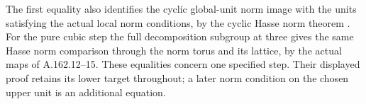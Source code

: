 The first equality also identifies the cyclic global-unit
norm image with the units satisfying the actual local norm
conditions, by the cyclic Hasse norm theorem
\cite[Chapter VIII, Theorem 3.1, printed p.~234]{MilneCFT}.
For the pure cubic step the full decomposition subgroup at
three gives the same Hasse norm comparison through the norm
torus and its lattice, by the actual maps of A.162.12--15.
These equalities concern one specified step.  Their displayed
proof retains its lower target throughout; a later norm
condition on the chosen upper unit is an additional equation.
